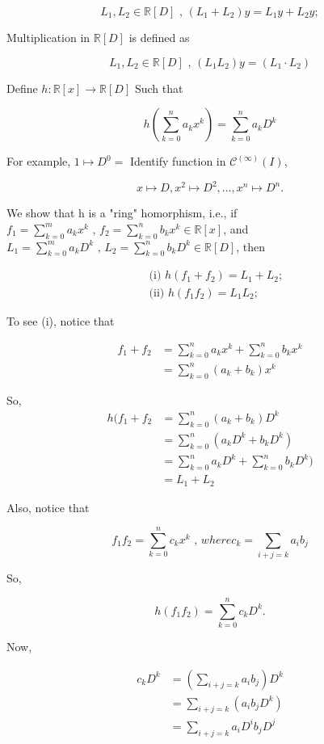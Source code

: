 \[ L_1, L_2 \in \mathbb{R} [D] \text{ , } (L_1 + L_2)y = L_1y + L_2y ;\]

Multiplication in \( \mathbb{R}[D] \) is defined as 

\[  L_1, L_2 \in \mathbb{R} [D] \text{ , } (L_1  L_2)y =( L_1 \cdot L_2
)\]

Define \( h : \mathbb{R} [x] \to \mathbb{R}[D] \) Such that 

\[ h\left(\sum_{k=0}^n a_k x^k \right) = \sum_{k=0}^n a_k D^k\]

For example,  \( 1 \mapsto D^0 = \) Identify function in \(
\mathscr{C}^{(\infty)} (I) \), 

\[ x \mapsto D, x^2 \mapsto D^2, \dots , x^n \mapsto D^n. \]

We show that h is a "ring" homorphism, i.e., if \( f_1 = \sum_{k=0}^m a_k
x^k \text{ , } f_2 = \sum_{k=0}^n b_k x^k \in \mathbb{R} [x]\), and \( L_1 =
\sum_{k=0}^m a_k D^k \text{ ,  } L_2 = \sum_{k=0}^n b_k D^k \in
\mathbb{R} [D]\), then 

\begin{align*}
  &\text{ (i) } h(f_1 + f_2) = L_1 + L_2; \\
  &\text{ (ii) } h(f_1  f_2) = L_1  L_2; 
\end{align*}

To see (i), notice that 

\begin{align*}
  f_1 + f_2 &= \sum_{k=0}^n a_k x^k + \sum_{k=0}^n b_k x^k \\
  &=  \sum_{k=0}^n (a_k + b_k) x^k
\end{align*}

So, 
\begin{align*}
  h(f_1 +f_2 &=  \sum_{k=0}^n (a_k + b_k) D^k \\
  &=  \sum_{k=0}^n (a_kD^k + b_kD^k) \\
  &=  \sum_{k=0}^n a_kD^k + \sum_{k=0}^n b_kD^k) \\
  &= L_1 + L_2
\end{align*}

Also, notice that

\[ f_1f_2 =  \sum_{k=0}^n c_k x^k \text{ , } where c_k = \sum_{i+j=k}
a_ib_j \]

So, 

\[ h(f_1f_2) = \sum_{k=0}^n c_kD^k. \]

Now, 

\begin{align*}
  c_kD^k &= \left( \sum_{i+j=k} a_ib_j\right) D^k \\
  &= \sum_{i+j=k} (a_ib_jD^k) \\
  &= \sum_{i+j=k} a_iD^ib_jD^j
\end{align*}

